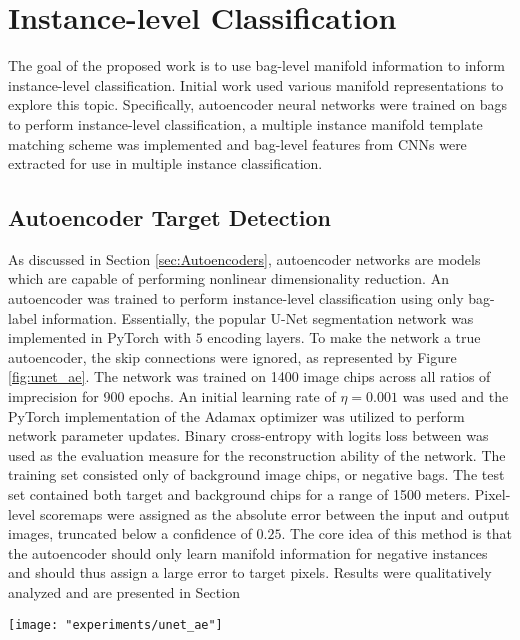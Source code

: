 \section{Instance-level Classification}
The goal of the proposed work is to use bag-level manifold information to inform instance-level classification.  Initial work used various manifold representations to explore this topic.  Specifically, autoencoder neural networks were trained on bags to perform instance-level classification, a multiple instance manifold template matching scheme was implemented and bag-level features from CNNs were extracted for use in multiple instance classification.

\subsection{Autoencoder Target Detection}
As discussed in Section \ref{sec:Autoencoders}, autoencoder networks are models which are capable of performing nonlinear dimensionality reduction.  An autoencoder was trained to perform instance-level classification using only bag-label information.  Essentially, the popular U-Net \citep{Ronneberger2015Unet} segmentation network was implemented in PyTorch with $5$ encoding layers.  To make the network a true autoencoder, the skip connections were ignored, as represented by Figure \ref{fig:unet_ae}.  The network was trained on 1400 image chips across all ratios of imprecision for 900 epochs.  An initial learning rate of $\eta=0.001$ was used and the PyTorch implementation of the Adamax optimizer was utilized to perform network parameter updates.  Binary cross-entropy with logits loss between was used as the evaluation measure for the reconstruction ability of the network.  The training set consisted only of background image chips, or negative bags.  The test set contained both target and background chips for a range of 1500 meters.  Pixel-level scoremaps were assigned as the absolute error between the input and output images, truncated below a confidence of $0.25$.  The core idea of this method is that the autoencoder should only learn manifold information for negative instances and should thus assign a large error to target pixels.  Results were qualitatively analyzed and are presented in Section \label{results:ae_target_detection}
\begin{center}
	\begin{figure*}[h!]
		\centering
		\texttt{[image: "experiments/unet\_ae"]}
		\caption[U-Net autoencoder neural network]{A five-layer encoder U-Net convolutional neural network. The skip connections are not used such that the network is a true autoencoder.}
		\label{fig:unet_ae}
	\end{figure*}
\end{center}

